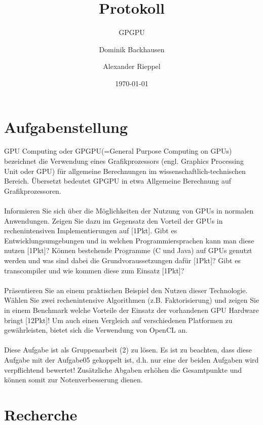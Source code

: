 \documentclass[a4paper,12pt]{scrreprt}
\begin{document}
\author{Dominik Backhausen \and Alexander Rieppel} %
\title{Protokoll} %
\subject{VSDB} %
\subtitle{GPGPU} %
\date{\today} %
\publishers{5AHITT} %

\maketitle
\tableofcontents


\chapter{Aufgabenstellung}
	GPU Computing oder GPGPU(=General Purpose Computing on GPUs) bezeichnet die Verwendung eines Grafikprozessors (engl. Graphics Processing Unit oder GPU) für allgemeine Berechnungen im wissenschaftlich-technischen Bereich. Übersetzt bedeutet GPGPU in etwa Allgemeine Berechnung auf Grafikprozessoren.\\\\
	
	Informieren Sie sich über die Möglichkeiten der Nutzung von GPUs in normalen Anwendungen. Zeigen Sie dazu im Gegensatz den Vorteil der GPUs in rechenintensiven Implementierungen auf [1Pkt]. Gibt es Entwicklungsumgebungen und in welchen Programmiersprachen kann man diese nutzen [1Pkt]? Können bestehende Programme (C und Java) auf GPUs genutzt werden und was sind dabei die Grundvoraussetzungen dafür [1Pkt]? Gibt es transcompiler und wie kommen diese zum Einsatz [1Pkt]?\\\\
	
	Präsentieren Sie an einem praktischen Beispiel den Nutzen dieser Technologie. Wählen Sie zwei rechenintensive Algorithmen (z.B. Faktorisierung) und zeigen Sie in einem Benchmark welche Vorteile der Einsatz der vorhandenen GPU Hardware bringt [12Pkt]! Um auch einen Vergleich auf verschiedenen Platformen zu gewährleisten, bietet sich die Verwendung von OpenCL an.\\\\
	
	Diese Aufgabe ist als Gruppenarbeit (2) zu lösen. Es ist zu beachten, dass diese Aufgabe mit der Aufgabe05 gekoppelt ist, d.h. nur eine der beiden Aufgaben wird verpflichtend bewertet! Zusätzliche Abgaben erhöhen die Gesamtpunkte und können somit zur Notenverbesserung dienen.
\chapter{Recherche}
\end{document}
